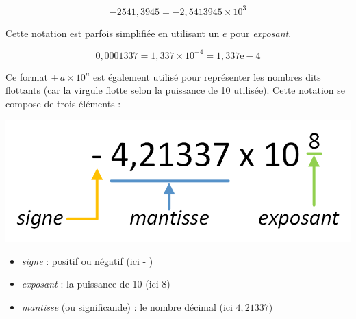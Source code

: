 \documentclass[11pt,a4paper]{article}
\begin{document}
\bigskip

\begin{equation*}
-2541,3945 = -2,5413945 \times 10^{3}
\label{equation:1-Notation-Scientifique}
\end{equation*}

\bigskip

Cette notation est parfois simplifiée en utilisant un $ e $ pour \textit{exposant}.

\bigskip

\begin{equation*}
0,0001337 = 1,337 \times 10^{-4} = 1,337\text{e}-4
\label{equation:2-Notation-Scientifique}
\end{equation*}

\bigskip

Ce format $ \pm \, a \times 10^{n} $ est également utilisé pour représenter les nombres dits flottants (car la virgule \og flotte \fg{} selon la puissance de 10 utilisée).
Cette notation se compose de trois éléments :

\bigskip


\begin{center}
\includegraphics[scale=0.75]{img/floats_parties.png}
\end{center}

\bigskip

\begin{itemize}
\item \textit{signe} : positif ou négatif (ici \og - \fg{})
\item \textit{exposant} : la puissance de 10 (ici $ 8 $)
\item \textit{mantisse} (ou significande) : le nombre décimal (ici $ 4,21337 $)
\end{itemize}
\end{document}
